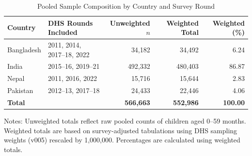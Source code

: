 \begin{table}[htbp]
\centering
\begin{threeparttable}
\caption{Pooled Sample Composition by Country and Survey Round}
\label{tab:app_sample_by_country}
\begin{tabular}{l l r r r}
\toprule
Country & DHS Rounds Included & Unweighted $n$ & Weighted Total & Weighted (\%) \\
\midrule
Bangladesh & 2011, 2014, 2017--18, 2022 & 34,182 & 34,492 & 6.24 \\
India & 2015--16, 2019--21 & 492,332 & 480,403 & 86.87 \\
Nepal & 2011, 2016, 2022 & 15,716 & 15,644 & 2.83 \\
Pakistan & 2012--13, 2017--18 & 24,433 & 22,446 & 4.06 \\
\midrule
\textbf{Total} &  & \textbf{566,663} & \textbf{552,986} & \textbf{100.00} \\
\bottomrule
\end{tabular}
\begin{tablenotes}
\footnotesize
\item Notes: Unweighted totals reflect raw pooled counts of children aged 0--59 months. 
Weighted totals are based on survey-adjusted tabulations using DHS sampling weights (v005) rescaled by 1,000,000. Percentages are calculated using weighted totals.
\end{tablenotes}
\end{threeparttable}
\end{table}